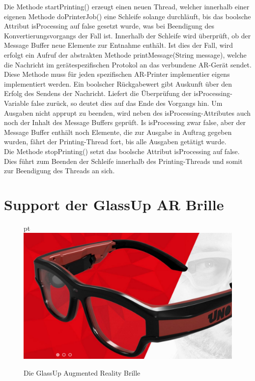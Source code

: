 Die Methode startPrinting() erzeugt einen neuen Thread, welcher innerhalb einer eigenen Methode doPrinterJob() eine Schleife solange durchläuft, bis das boolsche Attribut isProcessing auf false gesetzt wurde, was bei Beendigung des Konvertierungsvorgangs der Fall ist.
Innerhalb der Schleife wird überprüft, ob der Message Buffer neue Elemente zur Entnahme enthält. Ist dies der Fall, wird erfolgt ein Aufruf der abstrakten Methode printMessage(String message), welche die Nachricht im gerätespezifischen Protokol an das verbundene AR-Gerät sendet. Diese Methode muss für jeden spezifischen AR-Printer implementier eigens implementiert werden. Ein boolscher Rückgabewert gibt Auskunft über den Erfolg des Sendens der Nachricht. Liefert die Überprüfung der isProcessing-Variable false zurück, so deutet dies auf das Ende des Vorgangs hin. Um Ausgaben nicht apprupt zu beenden, wird neben des isProcessing-Attributes auch noch der Inhalt des Message Buffers geprüft. Is isProcessing zwar false, aber der Message Buffer enthält noch Elemente, die zur Ausgabe in Auftrag gegeben wurden, fährt der Printing-Thread fort, bis alle Ausgaben getätigt wurde.\\
Die Methode stopPrinting() setzt das boolsche Attribut isProcessing auf false. Dies führt zum Beenden der Schleife innerhalb des Printing-Threads und somit zur Beendigung des Threads an sich.
\section{Support der GlassUp AR Brille}
\begin{figure}{\linewidth pt}
	\includegraphics[width=\linewidth]{../images/glassUpGlasses.JPG}
	\caption{Die GlassUp Augmented Reality Brille\cite{glassup_home_2017}}
	\label{fig:GlassUpGlasses}
\end{figure}
